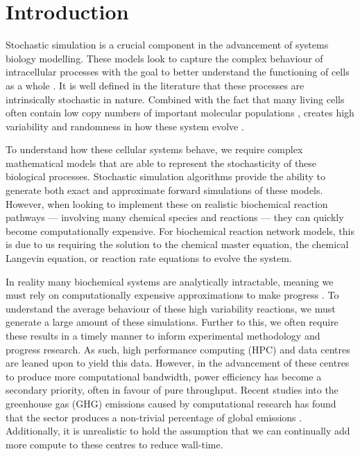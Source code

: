 \section{Introduction}
Stochastic simulation is a crucial component in the advancement of systems biology modelling. These models look to capture the complex behaviour of intracellular processes with the goal to better understand the functioning of cells as a whole \cite{abkowitzEvidenceThatHematopoiesis1996, arkinStochasticKineticAnalysis1998, kaernStochasticityGeneExpression2005, wilkinsonStochasticModellingQuantitative2009}. It is well defined in the literature that these processes are intrinsically stochastic in nature. Combined with the fact that many living cells often contain low copy numbers of important molecular populations \cite{guptasarmaDoesReplicationinducedTranscription1995, elowitzStochasticGeneExpression2002}, creates high variability and randomness in how these system evolve \cite{kaernStochasticityGeneExpression2005, elowitzStochasticGeneExpression2002, rajNatureNurtureChance2008}. 

To understand how these cellular systems behave, we require complex mathematical models that are able to represent the stochasticity of these biological processes. Stochastic simulation algorithms provide the ability to generate both exact and approximate forward simulations of these models. However, when looking to implement these on realistic biochemical reaction pathways --- involving many chemical species and reactions --- they can quickly become computationally expensive. For biochemical reaction network models, this is due to us requiring the solution to the chemical master equation, the chemical Langevin equation, or reaction rate equations to evolve the system. 

In reality many biochemical systems are analytically intractable, meaning we must rely on computationally expensive approximations to make progress \cite{wilkinsonStochasticModellingQuantitative2009, warneSimulationInferenceAlgorithms2019}. To understand the average behaviour of these high variability reactions, we must generate a large amount of these simulations. Further to this, we often require these results in a timely manner to inform experimental methodology and progress research. As such, high performance computing (HPC) and data centres are leaned upon to yield this data. However, in the advancement of these centres to produce more computational bandwidth, power efficiency has become a secondary priority, often in favour of pure throughput. Recent studies into the greenhouse gas (GHG) emissions caused by computational research has found that the sector produces a non-trivial percentage of global emissions \cite{lannelongueCarbonFootprintEstimation2023, lannelongueGREENERPrinciplesEnvironmentally2023}. Additionally, it is unrealistic to hold the assumption that we can continually add more compute to these centres to reduce wall-time. 

